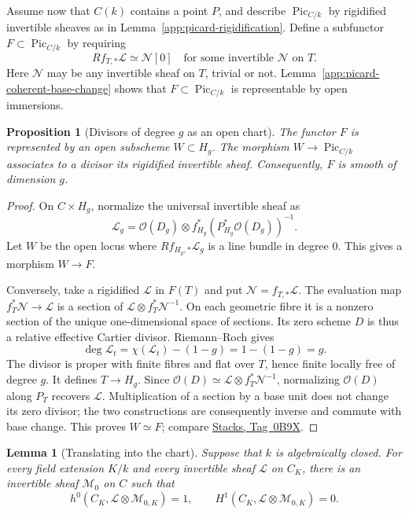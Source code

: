 \documentclass[11pt,a4paper]{article}
\numberwithin{equation}{section}
\newtheorem{lemma}[theorem]{Lemma}
\newtheorem{proposition}[theorem]{Proposition}
\theoremstyle{definition}
\theoremstyle{remark}
\newcommand{\stacks}[1]{\href{https://stacks.math.columbia.edu/tag/#1}{\textnormal{Stacks, Tag~#1}}}
\begin{document}
Assume now that $C(k)$ contains a point $P$, and describe
$\operatorname{Pic}_{C/k}$ by rigidified invertible sheaves as in
Lemma~\ref{app:picard-rigidification}. Define a subfunctor
$F\subset\operatorname{Pic}_{C/k}$ by requiring
\[
 Rf_{T,*}\mathcal L\simeq\mathcal N[0]
 \quad\text{for some invertible }\mathcal N\text{ on }T.
\]
Here $\mathcal N$ may be any invertible sheaf on $T$, trivial or not.
Lemma~\ref{app:picard-coherent-base-change} shows that
$F\subset\operatorname{Pic}_{C/k}$ is representable by open immersions.

\begin{proposition}[Divisors of degree $g$ as an open chart]
\label{app:picard-abel-chart}
The functor $F$ is represented by an open subscheme $W\subset H_g$.
The morphism $W\to\operatorname{Pic}_{C/k}$ associates to a divisor its rigidified
invertible sheaf. Consequently, $F$ is smooth of dimension $g$.
\end{proposition}

\begin{proof}
On $C\times H_g$, normalize the universal invertible sheaf as
\[
 \mathcal L_g=\mathcal O(D_g)\otimes
 f_{H_g}^*(P_{H_g}^*\mathcal O(D_g))^{-1}.
\]
Let $W$ be the open locus where $Rf_{H_g,*}\mathcal L_g$ is a line
bundle in degree $0$. This gives a morphism $W\to F$.

Conversely, take a rigidified $\mathcal L$ in $F(T)$ and put
$\mathcal N=f_{T,*}\mathcal L$. The evaluation map
$f_T^*\mathcal N\to\mathcal L$ is a section of
$\mathcal L\otimes f_T^*\mathcal N^{-1}$. On each geometric fibre
it is a nonzero section of the unique one-dimensional space of
sections. Its zero scheme $D$ is thus a relative effective Cartier
divisor. Riemann--Roch gives
\[
 \deg\mathcal L_t
     =\chi(\mathcal L_t)-(1-g)=1-(1-g)=g.
\]
The divisor is proper with finite fibres and flat over $T$, hence
finite locally free of degree $g$. It defines $T\to H_g$.
Since $\mathcal O(D)\simeq\mathcal L\otimes f_T^*\mathcal N^{-1}$,
normalizing $\mathcal O(D)$ along $P_T$ recovers $\mathcal L$.
Multiplication of a section by a base unit does not change its zero
divisor; the two constructions are consequently inverse and commute
with base change. This proves $W\simeq F$; compare \stacks{0B9X}.
\end{proof}

\begin{lemma}[Translating into the chart]
\label{app:picard-twist}
Suppose that $k$ is algebraically closed. For every field extension
$K/k$ and every invertible sheaf $\mathcal L$ on $C_K$, there is an
invertible sheaf $\mathcal M_0$ on $C$ such that
\[
 h^0(C_K,\mathcal L\otimes\mathcal M_{0,K})=1,
 \qquad H^1(C_K,\mathcal L\otimes\mathcal M_{0,K})=0.
\]
\end{lemma}
\end{document}

